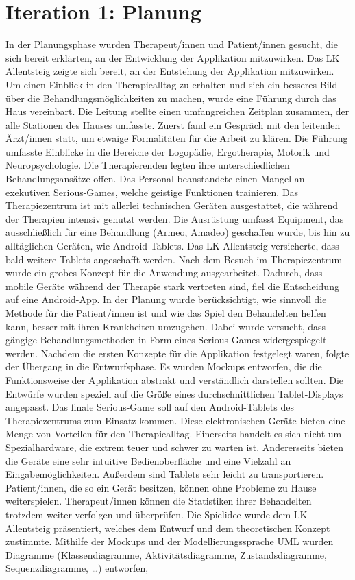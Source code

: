 \section{Iteration 1: Planung}\label{sec:iteration1}
In der Planungsphase wurden Therapeut/innen und Patient/innen gesucht, die sich bereit erklärten, an der Entwicklung der Applikation mitzuwirken. Das LK Allentsteig zeigte sich bereit, an der Entstehung der Applikation mitzuwirken. Um einen Einblick in den Therapiealltag zu erhalten und sich ein besseres Bild über die Behandlungsmöglichkeiten zu machen, wurde eine Führung durch das Haus vereinbart. Die Leitung stellte einen umfangreichen Zeitplan zusammen, der alle Stationen des Hauses umfasste. Zuerst fand ein Gespräch mit den leitenden Ärzt/innen statt, um etwaige Formalitäten für die Arbeit zu klären. Die Führung umfasste Einblicke in die Bereiche der Logopädie, Ergotherapie, Motorik und Neuropsychologie. Die Therapierenden legten ihre unterschiedlichen Behandlungsansätze offen. Das Personal beanstandete einen Mangel an exekutiven Serious-Games, welche geistige Funktionen trainieren. Das Therapiezentrum ist mit allerlei technischen Geräten ausgestattet, die während der Therapien intensiv genutzt werden. Die Ausrüstung umfasst Equipment, das ausschließlich für eine Behandlung (\href{https://www.hocoma.com/de/losungen/armeo-spring/}{Armeo}, \href{https://www.amadeosystems.com/de/}{Amadeo}) geschaffen wurde, bis hin zu alltäglichen Geräten, wie Android Tablets. Das LK Allentsteig versicherte, dass bald weitere Tablets angeschafft werden. Nach dem Besuch im Therapiezentrum wurde ein grobes Konzept für die Anwendung ausgearbeitet. Dadurch, dass mobile Geräte während der Therapie stark vertreten sind, fiel die Entscheidung auf eine Android-App. In der Planung wurde berücksichtigt, wie sinnvoll die Methode für die Patient/innen ist und wie das Spiel den Behandelten helfen kann, besser mit ihren Krankheiten umzugehen. Dabei wurde versucht, dass gängige Behandlungsmethoden in Form eines Serious-Games widergespiegelt werden. Nachdem die ersten Konzepte für die Applikation festgelegt waren, folgte der Übergang in die Entwurfsphase. Es wurden Mockups entworfen, die die Funktionsweise der Applikation abstrakt und verständlich darstellen sollten. Die Entwürfe wurden speziell auf die Größe eines durchschnittlichen Tablet-Displays angepasst. Das finale Serious-Game soll auf den Android-Tablets des Therapiezentrums zum Einsatz kommen. Diese elektronischen Geräte bieten eine Menge von Vorteilen für den Therapiealltag. Einerseits handelt es sich nicht um Spezialhardware, die extrem teuer und schwer zu warten ist. Andererseits bieten die Geräte eine sehr intuitive Bedienoberfläche und eine Vielzahl an Eingabemöglichkeiten. Außerdem sind Tablets sehr leicht zu transportieren. Patient/innen, die so ein Gerät besitzen, können ohne Probleme zu Hause weiterspielen. Therapeut/innen können die Statistiken ihrer Behandelten trotzdem weiter verfolgen und überprüfen. Die Spielidee wurde dem LK Allentsteig präsentiert, welches dem Entwurf und dem theoretischen Konzept zustimmte. Mithilfe der Mockups und der Modellierungssprache \ac{UML} wurden Diagramme (Klassendiagramme, Aktivitätsdiagramme, Zustandsdiagramme, Sequenzdiagramme, \dots) entworfen, 